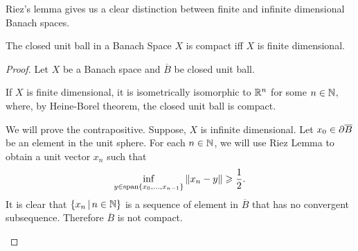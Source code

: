 \documentclass{article}
\begin{document}
Riez's lemma gives us a clear distinction between finite and infinite dimensional Banach spaces. 
\begin{mdframed}
\begin{cor}
The closed unit ball in a Banach Space $X$ is compact iff $X$ is finite dimensional. 
\end{cor}
\begin{proof}
Let $X$ be a Banach space and $\overline{B}$ be closed unit ball. 
\begin{case}[ $\Longleftarrow$ ] If $X$ is finite dimensional, it is isometrically isomorphic to $\R^n$ for some $n \in \N$, where, by Heine-Borel theorem, the closed unit ball is compact. 
\end{case}


\begin{case}[$\implies$] We will prove the contrapositive. Suppose, $X$ is infinite dimensional. Let $x_0 \in \p \overline{B}$ be an element in the unit sphere. For each $n \in \N$, we will use Riez Lemma to obtain a unit vector $x_n$ such that 
$$\inf_{y \in \mathrm{span}\set{x_0, \dots, x_{n - 1}}} \norm[x_n - y] \geq \frac{1}{2}. $$
It is clear that $\set{x_n \wh n \in \N}$ is a sequence of element in $\overline{B}$ that has no convergent subsequence. Therefore $\overline{B}$ is not compact. 
\end{case}
\end{proof}
\end{mdframed}





\end{document}

